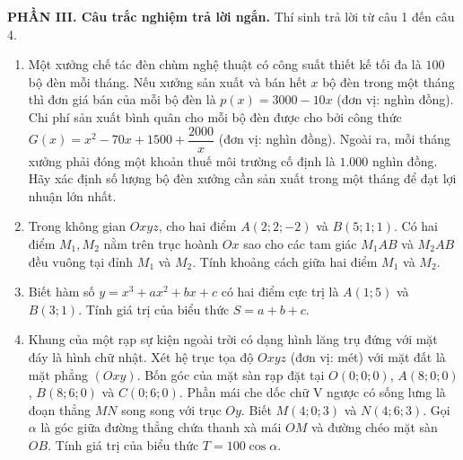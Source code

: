 \documentclass[12pt]{article}
\begin{document}
	\noindent\textbf{PHẦN III. Câu trắc nghiệm trả lời ngắn.} Thí sinh trả lời từ câu 1 đến câu 4.
	\vspace{2mm}
	
	\begin{enumerate}[label=\textbf{Câu \arabic*.}, leftmargin=*]
		
		\item Một xưởng chế tác đèn chùm nghệ thuật có công suất thiết kế tối đa là $100$ bộ đèn mỗi tháng. Nếu xưởng sản xuất và bán hết $x$ bộ đèn trong một tháng thì đơn giá bán của mỗi bộ đèn là $p(x) = 3000 - 10x$ (đơn vị: nghìn đồng). Chi phí sản xuất bình quân cho mỗi bộ đèn được cho bởi công thức $G(x) = x^2 - 70x + 1500 + \dfrac{2000}{x}$ (đơn vị: nghìn đồng). Ngoài ra, mỗi tháng xưởng phải đóng một khoản thuế môi trường cố định là $1.000$ nghìn đồng. Hãy xác định số lượng bộ đèn xưởng cần sản xuất trong một tháng để đạt lợi nhuận lớn nhất.
		\vspace{4mm}
		
		\item Trong không gian $Oxyz$, cho hai điểm $A(2; 2; -2)$ và $B(5; 1; 1)$. Có hai điểm $M_1, M_2$ nằm trên trục hoành $Ox$ sao cho các tam giác $M_1AB$ và $M_2AB$ đều vuông tại đỉnh $M_1$ và $M_2$. Tính khoảng cách giữa hai điểm $M_1$ và $M_2$.
		\vspace{4mm}
		
		\item Biết hàm số $y = x^3 + ax^2 + bx + c$ có hai điểm cực trị là $A(1; 5)$ và $B(3; 1)$. Tính giá trị của biểu thức $S = a + b + c$.
		\vspace{4mm}
		
		\item Khung của một rạp sự kiện ngoài trời có dạng hình lăng trụ đứng với mặt đáy là hình chữ nhật. Xét hệ trục tọa độ $Oxyz$ (đơn vị: mét) với mặt đất là mặt phẳng $(Oxy)$. Bốn góc của mặt sàn rạp đặt tại $O(0; 0; 0)$, $A(8; 0; 0)$, $B(8; 6; 0)$ và $C(0; 6; 0)$. Phần mái che dốc chữ V ngược có sống lưng là đoạn thẳng $MN$ song song với trục $Oy$. Biết $M(4; 0; 3)$ và $N(4; 6; 3)$. Gọi $\alpha$ là góc giữa đường thẳng chứa thanh xà mái $OM$ và đường chéo mặt sàn $OB$. Tính giá trị của biểu thức $T = 100 \cos \alpha$.
		

\end{enumerate}
\end{document}
